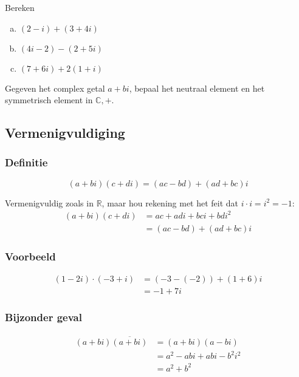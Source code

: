 \documentclass[12pt,twoside,a4]{article}
\begin{document}
\begin{oefening}
  Bereken
  \begin{enumerate}[(a)]
  \itemsep1em
  \item $\displaystyle (2-i)+(3+4i)$
  \item $\displaystyle (4i-2)-(2+5i)$
  \item $\displaystyle (7+6i)+2(1+i)$
  \end{enumerate}
\end{oefening}

\begin{oefening}
  Gegeven het complex getal $a+bi$, bepaal het neutraal element en het symmetrisch element in $\mathbb{C}, +$.
\end{oefening}

\subsection{Vermenigvuldiging}

\subsubsection*{Definitie}
\begin{mdframed}
\[(a+bi)(c+di) = (ac - bd) + (ad + bc)i\]
\end{mdframed}

Vermenigvuldig zoals in $\mathbb{R}$, maar hou rekening met het feit dat $i\cdot i=i^2=-1$:
\begin{align*}
  (a+bi)(c+di) &= ac + adi + bci + bdi^2\\
               &= (ac - bd) + (ad + bc)i
\end{align*}

\subsubsection*{Voorbeeld}
\begin{align*}
  (1-2i)\cdot(-3+i) &= (-3 - (-2)) + (1 + 6)i\\
               &= -1 + 7i
\end{align*}

\subsubsection*{Bijzonder geval}
\begin{align*}
  (a+bi)\overline{(a+bi)} &= (a+bi)(a-bi) \\
                          &= a^2 - abi + abi - b^2i^2 \\
                          &= a^2 + b^2
\end{align*}
\end{document}

